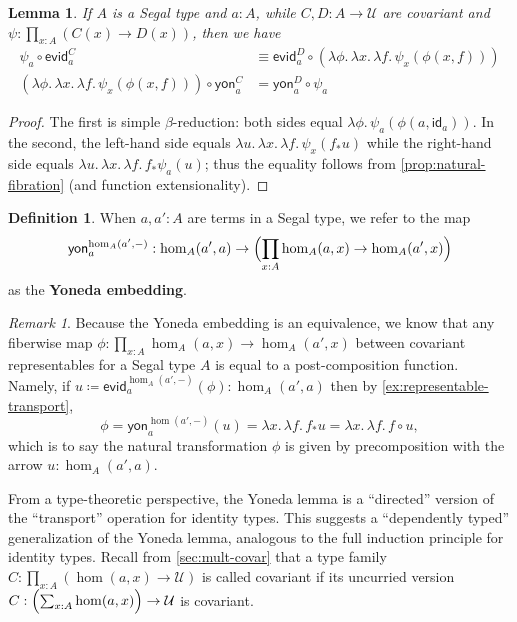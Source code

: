 \documentclass{amsart}
\theoremstyle{plain}
\newtheorem{lem}[thm]{Lemma}
\theoremstyle{definition}
\newtheorem{defn}[thm]{Definition}
\theoremstyle{remark}
\newtheorem{rmk}[thm]{Remark}
\numberwithin{equation}{section}
\newcommand{\jdeq}{\equiv}
\newcommand{\defeq}{\coloneqq}
\newcommand{\univtype}{\mathcal{U}}
\newcommand{\evid}{\mathsf{evid}}
\newcommand{\yon}{\mathsf{yon}}
\newcommand{\lam}[1]{\lambda #1.\,}
\newcommand{\idarr}[1]{\mathsf{id}_{#1}}
\newcommand{\covtr}[1]{{#1}_*}  %
\newcommand{\Parens}[1]{\Bigl(#1\Bigr)}
\begin{document}
\begin{lem}\label{thm:yoneda-nat}
  If $A$ is a Segal type and $a:A$, while $C,D:A\to\univtype$ are covariant and $\psi:\prod_{x:A} (C(x) \to D(x))$, then we have
  \begin{align*}
    \psi_a \circ \evid^C_a &\jdeq \evid^D_a \circ (\lam{\phi}\lam{x}\lam{f} \psi_x(\phi(x,f)))\\
    (\lam{\phi}\lam{x}\lam{f} \psi_x(\phi(x,f))) \circ \yon^C_a &= \yon^D_a \circ \psi_a
  \end{align*}
\end{lem}
\begin{proof}
  The first is simple $\beta$-reduction: both sides equal $\lam{\phi} \psi_a(\phi(a,\idarr a))$.
  In the second, the left-hand side equals $\lam u \lam x \lam f \psi_x(\covtr f u)$ while the right-hand side equals $\lam u \lam x \lam f \covtr f \psi_a(u)$; thus the equality follows from \cref{prop:natural-fibration} (and function extensionality).
\end{proof}


\begin{defn}\label{defn:yoneda-embedding}
When $a,a':A$ are terms in a Segal type, we refer to the map
\[   \yon^{\hom_A(a',-)}_a  :  \hom_A(a',a) \to \Parens{\prod_{x:A} \hom_A(a,x) \to \hom_A(a',x)}\]
as the \textbf{Yoneda embedding}. 
\end{defn}

\begin{rmk}\label{rmk:rep-nat-trans} Because the Yoneda embedding is an equivalence, we know that any fiberwise map $\phi : \prod_{x:A} \hom_A(a,x) \to \hom_A(a',x)$ between covariant representables for a Segal type $A$ is equal to a post-composition function. Namely, if $u \defeq \evid_a^{\hom_A(a',-)}(\phi) : \hom_A(a',a)$ then by \cref{ex:representable-transport}, 
\[\phi = \yon_a^{\hom(a',-)}(u) = \lam{x}\lam{f} \covtr f u = \lam{x}\lam{f} f \circ u,\] which is to say the natural transformation $\phi$ is given by precomposition with the arrow $u : \hom_A(a',a)$.
\end{rmk}

From a type-theoretic perspective, the Yoneda lemma is a ``directed'' version of the ``transport'' operation for identity types.
This suggests a ``dependently typed'' generalization of the Yoneda lemma, analogous to the full induction principle for identity types.
Recall from \cref{sec:mult-covar} that a type family $C:\prod_{x:A} (\hom(a,x)\to \univtype)$ is called covariant if its uncurried version $C:\Parens{\sum_{x:A} \hom(a,x)} \to \univtype$ is covariant.
\end{document}
